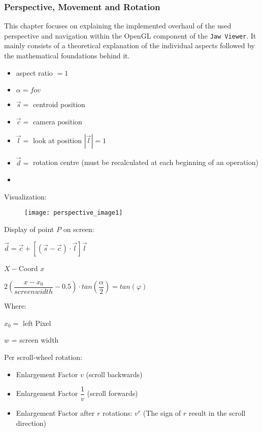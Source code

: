 \subsubsection{Perspective, Movement and Rotation}
This chapter focuses on explaining the implemented overhaul of the used perspective and navigation within the OpenGL component of the \verb|Jaw Viewer|. It mainly consists of a theoretical explanation of the individual aspects followed by the mathematical foundations behind it.

\begin{itemize}
	\item[] aspect ratio $= 1$
	\item[] $\alpha = fov$
	\item[] $\overrightarrow{s}=$ centroid position
	\item[] $\overrightarrow{c}=$ camera position
	\item[] $\overrightarrow{l}=$ look at position $|\overrightarrow{l}|= 1$ 
	\item[] $\overrightarrow{d}=$ rotation centre (must be recalculated at each beginning of an operation)
	\item[] 
\end{itemize}
Visualization:
\begin{figure}[h!]
	\centering
	\texttt{[image: perspective\_image1]}
\end{figure}

Display of point $P$ on screen:

\centerline{$\overrightarrow{d} = \overrightarrow{c} +\left[ \left(\overrightarrow{s} -\overrightarrow{c}\right)\cdot \overrightarrow{l}\right] \overrightarrow{l} $}

$X - $Coord $x$

\centerline{$\boxed{ 2 \left(\dfrac{x - x_{0}}{screen width} - 0.5\right)\cdot tan \left(\dfrac{\alpha}{2}\right) = tan(\varphi)}$}

Where: 

$x_{0} =$ left Pixel

$w$ = screen width




Per scroll-wheel rotation:

\begin{itemize}
	\item[]	Enlargement Factor $v$ (scroll backwards)
	\item[]	Enlargement Factor $\dfrac{1}{v}$ (scroll forwards)
	\item[]	Enlargement Factor after $r$ rotations: $v^{r}$ (The sign of $r$ result in the scroll direction)
\end{itemize}

